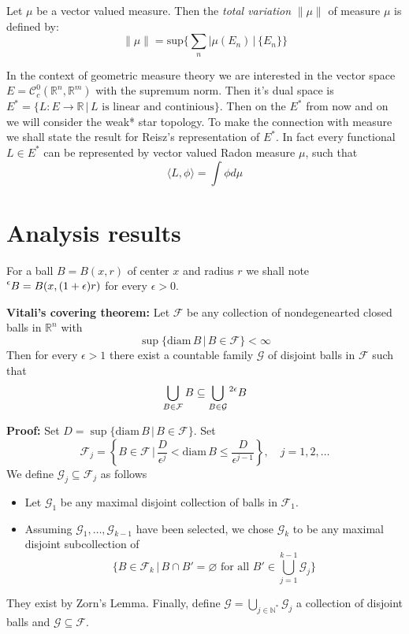 \documentclass{article}
\begin{document}
\vspace{1ex} Let $\mu$ be a vector valued measure. Then the \emph{total
variation} $\|\mu\|$ of measure $\mu$ is defined by:
\[\|\mu\| = \text{sup}\{\sum_n|\mu(E_n)\,|\,\{E_n\}\}\]


\vspace{1ex}
In the context of geometric measure theory we are interested in the vector
space $E=\mathcal{C}^0_c(\mathbb{R}^n, \mathbb{R}^m)$ with the supremum norm.
Then it's dual space is $E^*=\{L:E\rightarrow\mathbb{R}\,|\,L\text{ is linear
and continious}\}$. Then on the $E^*$ from now and on we will consider the weak*
star topology. To make the connection with measure we shall state the result for
Reisz's representation of $E^*$. In fact every functional $L\in E^*$ can be
represented by vector valued Radon measure $\mu$, such that
\[\langle L,\phi\rangle=\int\phi d\mu\]

\section{Analysis results}

For a ball $B=B(x, r)$ of center $x$ and radius $r$ we shall note $\prescript{\epsilon}{}B
=B(x, (1+\epsilon)r)$ for every $\epsilon>0$.

\vspace{1ex}
\textbf{Vitali's covering theorem:}
Let $\mathcal{F}$ be any collection of nondegenearted closed balls in
$\mathbb{R}^n$ with
\[ \sup\{\text{diam}\,B\,|\, B\in\mathcal{F}\}<\infty \]
Then for every $\epsilon>1$ there exist a countable family $\mathcal{G}$ of
disjoint balls in $\mathcal{F}$ such that
\[\bigcup_{B\in\mathcal{F}}B\subseteq\bigcup_{B\in\mathcal{G}}\prescript{2\epsilon}{}B\]

\vspace{1ex}
\textbf{Proof:}
Set $D=\sup\{\text{diam}\,B\,|\,B\in \mathcal{F}\}$. Set
\[\mathcal{F}_j=\left\{B\in\mathcal{F}\,|\,\frac{D}{\epsilon^j}<\text{diam}\,B\leq\frac{D}{\epsilon^{j-1}}\right\},\quad j=1,2,\ldots\]
We define $\mathcal{G}_j\subseteq\mathcal{F}_j$ as follows
\begin{itemize}
    \item Let $\mathcal{G}_1$ be any maximal disjoint collection of balls in
        $\mathcal{F}_1$.

    \item Assuming $\mathcal{G}_1,\ldots,\mathcal{G}_{k-1}$ have been selected,
        we chose $\mathcal{G}_k$ to be any maximal disjoint subcollection of
        \[ \{B\in\mathcal{F}_k\,|\,B\cap B'=\varnothing\text{ for all }B'\in\bigcup_{j=1}^{k-1}\mathcal{G}_j\}\]
\end{itemize}
They exist by Zorn's Lemma. Finally, define $\mathcal{G}=\bigcup_{j\in\mathbb{N}^*}\mathcal{G}_j$
a collection of disjoint balls and $\mathcal{G}\subseteq\mathcal{F}$.
\end{document}
